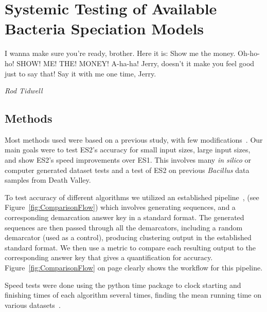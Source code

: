 \gobbletocpage
\chapter{Systemic Testing of Available Bacteria Speciation Models}
\restoretocpage

\begin{shadequote}
I wanna make sure you're ready, brother. Here it is: Show me the money. Oh-ho-ho! SHOW! ME! THE! MONEY! A-ha-ha! Jerry, doesn't it make you feel good just to say that! Say it with me one time, Jerry. \par\emph{Rod Tidwell}
\end{shadequote}


\section{Methods}
Most methods used were based on a previous study, with few modifications~\cite{carlo}.
Our main goals were to test ES2's accuracy for small input sizes, large input sizes, and show ES2's speed improvements over ES1.
This involves many \emph{in silico} or computer generated dataset tests and a test of ES2 on previous \emph{Bacillus} data samples from Death Valley.

To test accuracy of different algorithms we utilized an established pipeline~\cite{carlo}, (see Figure~\ref{fig:ComparisonFlow}) which involves generating sequences, and a corresponding demarcation answer key in a standard format.
The generated sequences are then passed through all the demarcators, including a random demarcator (used as a control), producing clustering output in the established standard format.
We then use a metric to compare each resulting output to the corresponding answer key that gives a quantification for accuracy. Figure~\ref{fig:ComparisonFlow} on page \pageref{fig:ComparisonFlow} clearly shows the workflow for this pipeline.

Speed tests were done using the python time package to clock starting and finishing times of each algorithm several times, finding the mean running time on various datasets~\cite{carlo}.

